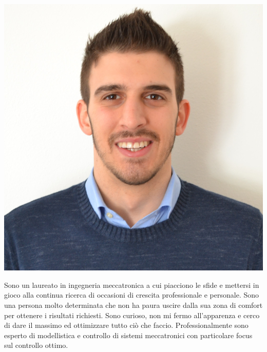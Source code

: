 \documentclass[9pt]{developercv} %
\begin{document}
\begin{minipage}[t]{0.2\textwidth} %
	\vspace{-\baselineskip} %
		\hfill
	\includegraphics[width=1.0\linewidth]{Fototessera.jpg}
\end{minipage}
%
%
%
\begin{minipage}[t]{0.5\textwidth} %
	\vspace{-\baselineskip} %
Sono un laureato in ingegneria meccatronica a cui piacciono le sfide e mettersi in gioco alla continua ricerca di occasioni di crescita professionale e personale.
Sono una persona molto determinata che non ha paura uscire dalla sua zona di comfort per ottenere i risultati richiesti. Sono curioso, non mi fermo all'apparenza e cerco di dare il massimo ed ottimizzare tutto ciò che faccio.
Professionalmente sono esperto di modellistica e controllo di sistemi meccatronici con particolare focus sul controllo ottimo.
%
\end{minipage}
\hfill %
\begin{minipage}[t]{0.45\textwidth} %
	\vspace{-\baselineskip} %
	\begin{barchart}{5.5}
	\end{barchart}
\end{minipage}
%
%
%
\end{document}
